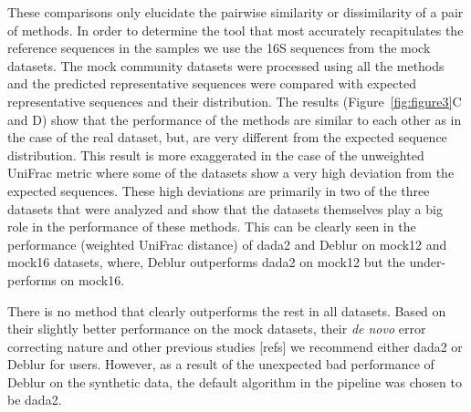 
  These comparisons only elucidate the pairwise similarity or dissimilarity of a pair of methods.
  In order to determine the tool that most accurately recapitulates the reference sequences in the samples we use the 16S sequences from the mock datasets.
  The mock community datasets were processed using all the methods and the predicted representative sequences were compared with expected representative sequences and their distribution.
  The results (Figure~\ref{fig:figure3}C and D) show that the performance of the methods are similar to each other as in the case of the real dataset, but, are very different from the expected sequence distribution.
  This result is more exaggerated in the case of the unweighted UniFrac metric where some of the datasets show a very high deviation from the expected sequences.
  These high deviations are primarily in two of the three datasets that were analyzed and show that the datasets themselves play a big role in the performance of these methods.
  This can be clearly seen in the performance (weighted UniFrac distance) of \ac{dada2} and Deblur on mock12 and mock16 datasets, where, Deblur outperforms \ac{dada2} on mock12 but the under-performs on mock16.

  There is no method that clearly outperforms the rest in all datasets.
  Based on their slightly better performance on the mock datasets, their \textit{de novo} error correcting nature and other previous studies [refs] we recommend either \ac{dada2} or Deblur for users.
  However, as a result of the unexpected bad performance of Deblur on the synthetic data, the default algorithm in the pipeline was chosen to be \ac{dada2}.

